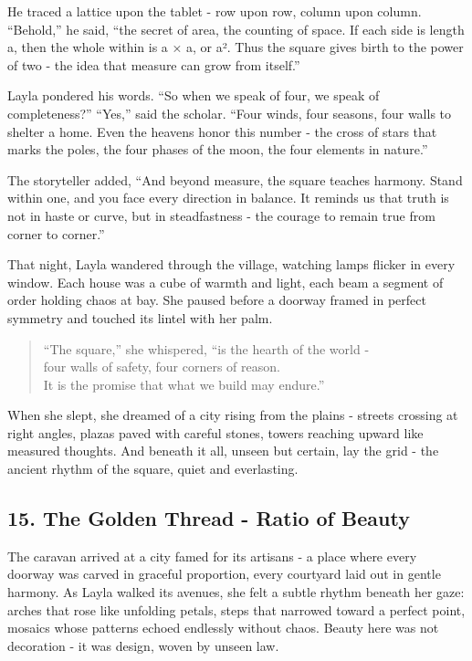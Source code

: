 \documentclass[
  letterpaper,
  DIV=11,
  numbers=noendperiod]{scrreprt}
\begin{document}
He traced a lattice upon the tablet - row upon row, column upon column.
``Behold,'' he said, ``the secret of area, the counting of space. If
each side is length a, then the whole within is a × a, or a². Thus the
square gives birth to the power of two - the idea that measure can grow
from itself.''

Layla pondered his words. ``So when we speak of four, we speak of
completeness?'' ``Yes,'' said the scholar. ``Four winds, four seasons,
four walls to shelter a home. Even the heavens honor this number - the
cross of stars that marks the poles, the four phases of the moon, the
four elements in nature.''

The storyteller added, ``And beyond measure, the square teaches harmony.
Stand within one, and you face every direction in balance. It reminds us
that truth is not in haste or curve, but in steadfastness - the courage
to remain true from corner to corner.''

That night, Layla wandered through the village, watching lamps flicker
in every window. Each house was a cube of warmth and light, each beam a
segment of order holding chaos at bay. She paused before a doorway
framed in perfect symmetry and touched its lintel with her palm.

\begin{quote}
``The square,'' she whispered, ``is the hearth of the world -\\
four walls of safety, four corners of reason.\\
It is the promise that what we build may endure.''
\end{quote}

When she slept, she dreamed of a city rising from the plains - streets
crossing at right angles, plazas paved with careful stones, towers
reaching upward like measured thoughts. And beneath it all, unseen but
certain, lay the grid - the ancient rhythm of the square, quiet and
everlasting.

\subsection{15. The Golden Thread - Ratio of
Beauty}\label{the-golden-thread---ratio-of-beauty}

The caravan arrived at a city famed for its artisans - a place where
every doorway was carved in graceful proportion, every courtyard laid
out in gentle harmony. As Layla walked its avenues, she felt a subtle
rhythm beneath her gaze: arches that rose like unfolding petals, steps
that narrowed toward a perfect point, mosaics whose patterns echoed
endlessly without chaos. Beauty here was not decoration - it was design,
woven by unseen law.
\end{document}
